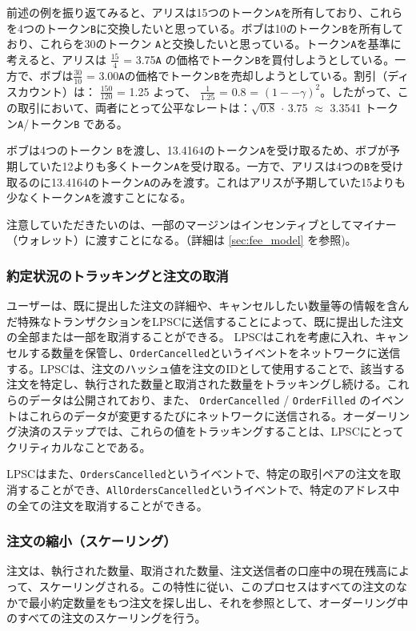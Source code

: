 \documentclass{article}
\begin{document}
\begin{multicols}{2}
前述の例を振り返てみると、アリスは15つのトークン\verb|A|を所有しており、これらを4つのトークン\verb|B|に交換したいと思っている。ボブは10のトークン\verb|B|を所有しており、これらを30のトークン \verb|A|と交換したいと思っている。トークン\verb|A|を基準に考えると、アリスは $\frac{15}{4}$ = 3.75\verb|A| の価格でトークン\verb|B|を買付しようとしている。一方で、ボブは$\frac{30}{10}$ = 3.00\verb|A|の価格でトークン\verb|B|を売却しようとしている。割引（ディスカウント）は： $\frac{150}{120}$ = 1.25 よって、 $\frac{1}{1.25}$ = 0.8 = $(1 −- \gamma)^2$。したがって、この取引において、両者にとって公平なレートは：$\sqrt{0.8}$ $\cdot$ 3.75 $\approx$ 3.3541 トークン\verb|A|/トークン\verb|B| である。

ボブは4つのトークン \verb|B|を渡し、13.4164のトークン\verb|A|を受け取るため、ボブが予期していた12よりも多くトークン\verb|A|を受け取る。一方で、アリスは4つの\verb|B|を受け取るのに13.4164のトークン\verb|A|のみを渡す。これはアリスが予期していた15よりも少なくトークン\verb|A|を渡すことになる。

注意していただきたいのは、一部のマージンはインセンティブとしてマイナー（ウォレット）に渡すことになる。（詳細は \ref{sec:fee_model} を参照)。


\subsubsection{約定状況のトラッキングと注文の取消}

ユーザーは、既に提出した注文の詳細や、キャンセルしたい数量等の情報を含んだ特殊なトランザクションをLPSCに送信することによって、既に提出した注文の全部または一部を取消することができる。
LPSCはこれを考慮に入れ、キャンセルする数量を保管し、\verb|OrderCancelled|というイベントをネットワークに送信する。LPSCは、注文のハッシュ値を注文のIDとして使用することで、該当する注文を特定し、執行された数量と取消された数量をトラッキングし続ける。これらのデータは公開されており、また、 \verb|OrderCancelled| / \verb|OrderFilled|  のイベントはこれらのデータが変更するたびにネットワークに送信される。オーダーリング決済のステップでは、これらの値をトラッキングすることは、LPSCにとってクリティカルなことである。

LPSCはまた、\verb|OrdersCancelled|というイベントで、特定の取引ペアの注文を取消することができ、\verb|AllOrdersCancelled|というイベントで、特定のアドレス中の全ての注文を取消することができる。


\subsubsection{注文の縮小（スケーリング）\label{sec:order_scaling}}
注文は、執行された数量、取消された数量、注文送信者の口座中の現在残高によって、スケーリングされる。この特性に従い、このプロセスはすべての注文のなかで最小約定数量をもつ注文を探し出し、それを参照として、オーダーリング中のすべての注文のスケーリングを行う。


\end{multicols}
\end{document}
